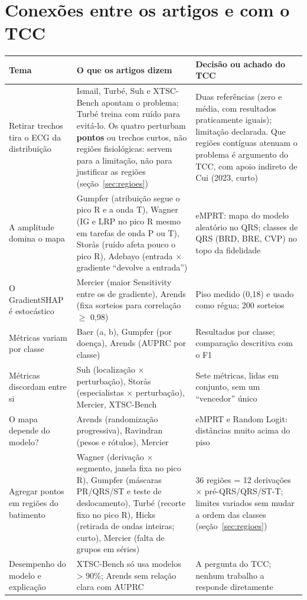 \documentclass[11pt,a4paper]{article}
\begin{document}
\section{Conexões entre os artigos e com o TCC}\label{sec:conexoes}
\begin{center}\small
\begin{tabularx}{\linewidth}{>{\raggedright\arraybackslash}p{3.1cm}XX}
\toprule
\textbf{Tema} & \textbf{O que os artigos dizem} & \textbf{Decisão ou achado do TCC} \\
\midrule
Retirar trechos tira o ECG da distribuição & Ismail, Turbé, Suh e XTSC-Bench apontam o problema; Turbé treina com ruído para evitá-lo. Os quatro perturbam \textbf{pontos} ou trechos curtos, não regiões fisiológicas: servem para a limitação, não para justificar as regiões (seção~\ref{sec:regioes}) & Duas referências (zero e média, com resultados praticamente iguais); limitação declarada. Que regiões contíguas atenuam o problema é argumento do TCC, com apoio indireto de Cui (2023, curto) \\ \addlinespace
A amplitude domina o mapa & Gumpfer (atribuição segue o pico R e a onda T), Wagner (IG e LRP no pico R mesmo em tarefas de onda P ou T), Storås (ruído afeta pouco o pico R), Adebayo (entrada × gradiente ``devolve a entrada'') & eMPRT: mapa do modelo aleatório no QRS; classes de QRS (BRD, BRE, CVP) no topo da fidelidade \\ \addlinespace
O GradientSHAP é estocástico & Mercier (maior Sensitivity entre os de gradiente), Arends (fixa sorteios para correlação $\ge$ 0,98) & Piso medido (0,18) e usado como régua; 200 sorteios \\ \addlinespace
Métricas variam por classe & Baer (a, b), Gumpfer (por doença), Arends (AUPRC por classe) & Resultados por classe; comparação descritiva com o F1 \\ \addlinespace
Métricas discordam entre si & Suh (localização × perturbação), Storås (especialistas × perturbação), Mercier, XTSC-Bench & Sete métricas, lidas em conjunto, sem um ``vencedor'' único \\ \addlinespace
O mapa depende do modelo? & Arends (randomização progressiva), Ravindran (pesos e rótulos), Mercier & eMPRT e Random Logit: distâncias muito acima do piso \\ \addlinespace
Agregar pontos em regiões do batimento & Wagner (derivação × segmento, janela fixa no pico R), Gumpfer (máscaras PR/QRS/ST e teste de deslocamento), Turbé (recorte fixo no pico R), Hicks (retirada de ondas inteiras; curto), Mercier (falta de grupos em séries) & 36 regiões = 12 derivações × pré-QRS/QRS/ST-T; limites variados sem mudar a ordem das classes (seção~\ref{sec:regioes}) \\ \addlinespace
Desempenho do modelo e explicação & XTSC-Bench só usa modelos > 90\%; Arends sem relação clara com AUPRC & A pergunta do TCC; nenhum trabalho a responde diretamente \\
\bottomrule
\end{tabularx}
\end{center}
\end{document}
